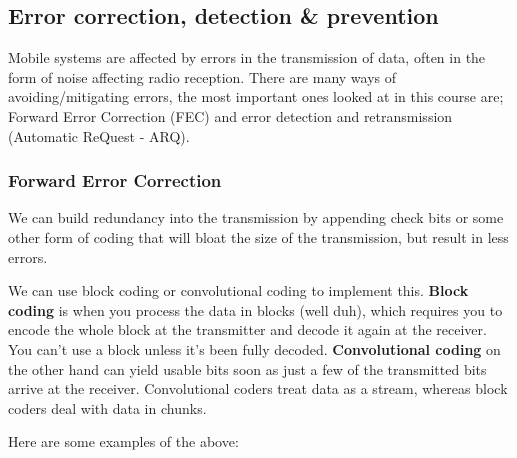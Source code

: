 \subsection{Error correction, detection \& prevention}

Mobile systems are affected by errors in the transmission of data, often in the
form of noise affecting radio reception. There are many ways of
avoiding/mitigating errors, the most important ones looked at in this course
are; Forward Error Correction (FEC) and error detection and retransmission
(Automatic ReQuest - ARQ).

\subsubsection{Forward Error Correction}

We can build redundancy into the transmission by appending check bits or some
other form of coding that will bloat the size of the transmission, but result in
less errors.

We can use block coding or convolutional coding to implement this. \textbf{Block
coding} is when you process the data in blocks (well duh), which requires you to
encode the whole block at the transmitter and decode it again at the receiver.
You can't use a block unless it's been fully decoded. \textbf{Convolutional
coding} on the other hand can yield usable bits soon as just a few of the
transmitted bits arrive at the receiver. Convolutional coders treat data as a
stream, whereas block coders deal with data in chunks.

Here are some examples of the above:

